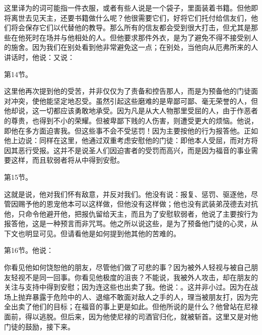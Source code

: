 \par

这里译为的词可能指一件衣服，或者有些人说是一个袋子，里面装着书籍。但他即将离世去见天主，还要书籍做什么呢？他很需要它们，好将它们托付给信友们，他们将会保存它们以代替他的教导。那么所有的信友都会受到很大打击，但尤其是那些在他死时在场并与他相处的人。但他要求那件外衣，是为了避免不得不接受别人的施舍。因为我们在别处看到他非常避免这一点；在别处，当他向从厄弗所来的人讲话时，他说：又说：\par

第14节。\par

这里他再次提到他的受苦，并非仅仅为了责备和控告那人，而是为预备他的门徒面对冲突，使他能坚定地忍受。虽然引起这些磨难的是卑鄙可鄙、毫无荣誉的人，但他却说，这一切都应该勇敢地承受。因为凡是从大人物那里受屈的人，由于作恶者的尊贵，也得到不小的荣耀。但被卑鄙下贱的人伤害，则遭受更大的烦恼。他说，即他在多方面迫害我。但这些事不会不受惩罚！因为主要按他的行为报答他。正如他上边说：同样在这里，他通过双重考虑安慰他的门徒：即他本人受屈，而对方将因其恶行受报。这并不是说圣人们因迫害者的受罚而高兴，而是因为福音的事业需要这样，而且软弱者将从中得到安慰。\par

第15节。\par

这就是说，他对我们怀有敌意，并反对我们。他没有说：报复、惩罚、驱逐他，尽管因赐予他的恩宠他本可以这样做，但他没有这样做；他也没有武装弟茂德去对抗他，只命令他避开他，把报仇留给天主，而且为了安慰软弱者，他说了主要按行为报答他，这是一种预言而非咒骂。他之所以说这些，是为了预备他门徒的心灵，从下文也明显可见。但请看他是如何提到他其他的苦难的。\par

第16节。他说：\par

你看见他如何饶恕他的朋友，尽管他们做了可悲的事？因为被外人轻视与被自己朋友轻视不是同一回事。你看见他极度的沮丧？不能说，我被外人攻击，却在朋友的关注与支持中得到安慰；因为连这些也出卖了我。他说：。这并非小过。因为在战场上抛弃暴露于危险中的人、退缩不敢面对敌人之手的人，理当被朋友打，因为完全出卖了他们的目标；在福音的事上更是如此。但他所说的是什么？他曾站在尼禄面前，得以逃脱。但后来，因为他使尼禄的司酒官归化，就被斩首。这里又是对他门徒的鼓励，接下来。\par

